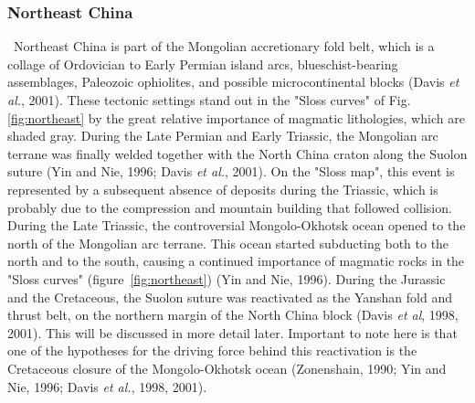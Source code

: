 \documentclass{article}
\begin{document}
 \subsubsection*{Northeast China} \label{sec:northeast}
 ~\indent Northeast  China is part  of the Mongolian  accretionary fold
 belt, which is a collage  of Ordovician to Early Permian island arcs,
 blueschist-bearing  assemblages, Paleozoic  ophiolites,  and possible
 microcontinental blocks  (Davis {\it  et al.}, 2001).   These tectonic
 settings stand out in the "Sloss curves" of Fig.  \ref{fig:northeast}
 by the  great relative importance of magmatic  lithologies, which are
 shaded  gray.  During  the  Late  Permian  and  Early  Triassic,  the
 Mongolian  arc terrane  was finally  welded together  with  the North
 China craton along  the Suolon suture (Yin and  Nie, 1996; Davis {\it
 et al.},  2001).  On the "Sloss  map", this event is  represented by a
 subsequent absence of deposits during the Triassic, which is probably
 due  to   the  compression   and  mountain  building   that  followed
 collision.    During   the    Late   Triassic,    the   controversial
 Mongolo-Okhotsk  ocean  opened to  the  north  of  the Mongolian  arc
 terrane. This ocean  started subducting both to the  north and to the
 south, causing a continued importance of magmatic rocks in the "Sloss
 curves" (figure~\ref{fig:northeast}) (Yin and Nie, 1996).  During the
 Jurassic and the Cretaceous, the Suolon suture was reactivated as the
 Yanshan fold  and thrust  belt, on the  northern margin of  the North
 China block (Davis {\it et  al}, 1998, 2001).  This will be discussed
 in more  detail later.   Important to  note here is  that one  of the
 hypotheses  for the  driving force  behind this  reactivation  is the
 Cretaceous  closure of the  Mongolo-Okhotsk ocean  (Zonenshain, 1990;
 Yin and Nie, 1996; Davis {\it et al.}, 1998, 2001).
\end{document}
